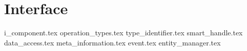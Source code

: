 \section{Interface}
{i_component.tex}
{operation_types.tex}
{type_identifier.tex}
{smart_handle.tex}
{data_access.tex}
{meta_information.tex}
{event.tex}
{entity_manager.tex}
